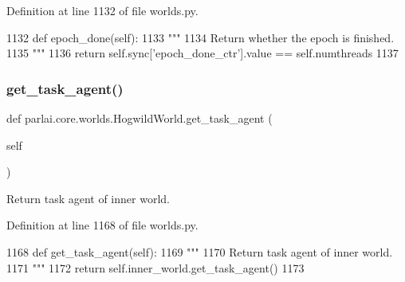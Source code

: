 Definition at line 1132 of file worlds.\+py.


\begin{DoxyCode}
1132     \textcolor{keyword}{def }epoch\_done(self):
1133         \textcolor{stringliteral}{"""}
1134 \textcolor{stringliteral}{        Return whether the epoch is finished.}
1135 \textcolor{stringliteral}{        """}
1136         \textcolor{keywordflow}{return} self.sync[\textcolor{stringliteral}{'epoch\_done\_ctr'}].value == self.numthreads
1137 
\end{DoxyCode}
\mbox{\label{classparlai_1_1core_1_1worlds_1_1HogwildWorld_a7dfc60f5229da37574c31479a0b2ce3a}} 
\subsubsection{\texorpdfstring{get\+\_\+task\+\_\+agent()}{get\_task\_agent()}}
{\footnotesize\ttfamily def parlai.\+core.\+worlds.\+Hogwild\+World.\+get\+\_\+task\+\_\+agent (\begin{DoxyParamCaption}\item[{}]{self }\end{DoxyParamCaption})}

\begin{DoxyVerb}Return task agent of inner world.
\end{DoxyVerb}
 

Definition at line 1168 of file worlds.\+py.


\begin{DoxyCode}
1168     \textcolor{keyword}{def }get\_task\_agent(self):
1169         \textcolor{stringliteral}{"""}
1170 \textcolor{stringliteral}{        Return task agent of inner world.}
1171 \textcolor{stringliteral}{        """}
1172         \textcolor{keywordflow}{return} self.inner\_world.get\_task\_agent()
1173 
\end{DoxyCode}
\mbox{\label{classparlai_1_1core_1_1worlds_1_1HogwildWorld_a6bc364b91906b14d792957c8eeed5206}} 
